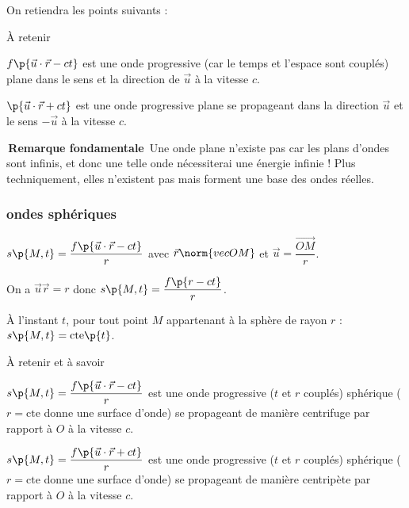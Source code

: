     On retiendra les points suivants :
    
    \begin{form}{À retenir}{}
        \begin{enumerate}
            \itt $f\p{\vec u \cdot \vec r - ct}$ est une onde progressive (car le temps et l'espace sont couplés) plane dans le sens et la direction de $\vec u$ à la vitesse $c$.
            
            \itt $\p{\vec u \cdot \vec r + ct}$ est une onde progressive plane se propageant dans la direction $\vec u$ et le sens $-\vec u$ à la vitesse $c$.
            
            \itt \colorbox{colform!20}{\textnormal{\color{colform}\sffamily\bfseries \,Remarque fondamentale\,}} Une onde plane n'existe pas car les plans d'ondes sont infinis, et donc une telle onde nécessiterai une énergie infinie ! Plus techniquement, elles n'existent pas mais forment une base des ondes réelles.
        \end{enumerate}
    \end{form}

    \subsubsection{ondes sphériques}

    $s\p{M, t} = \dfrac{f\p{\vec u \cdot \vec r - ct}}{r}$ avec $\vec r \norm{vec{OM}}$ et $\vec u = \dfrac{\vec{OM}}{r}$.
    
    On a $\vec u \vec r = r$ donc $s\p{M, t} = \dfrac{f\p{r - ct}}{r}$.
    
    À l'instant $t$, pour tout point $M$ appartenant à la sphère de rayon $r$ : \qquad\qquad $s\p{M, t} = \text{cte}\p{t}$.
    
    \begin{form}{À retenir et à savoir}{}
        \begin{enumerate}
            \itt $s\p{M, t} = \dfrac{f\p{\vec u \cdot \vec r - ct}}{r}$ est une onde progressive ($t$ et $r$ couplés) sphérique ($r = \text{cte}$ donne une surface d'onde) se propageant de manière centrifuge par rapport à $O$ à la vitesse $c$.
            
            \itt $s\p{M, t} = \dfrac{f\p{\vec u \cdot \vec r + ct}}{r}$ est une onde progressive ($t$ et $r$ couplés) sphérique ($r = \text{cte}$ donne une surface d'onde) se propageant de manière centripète par rapport à $O$ à la vitesse $c$.
        \end{enumerate}
    \end{form}
    
